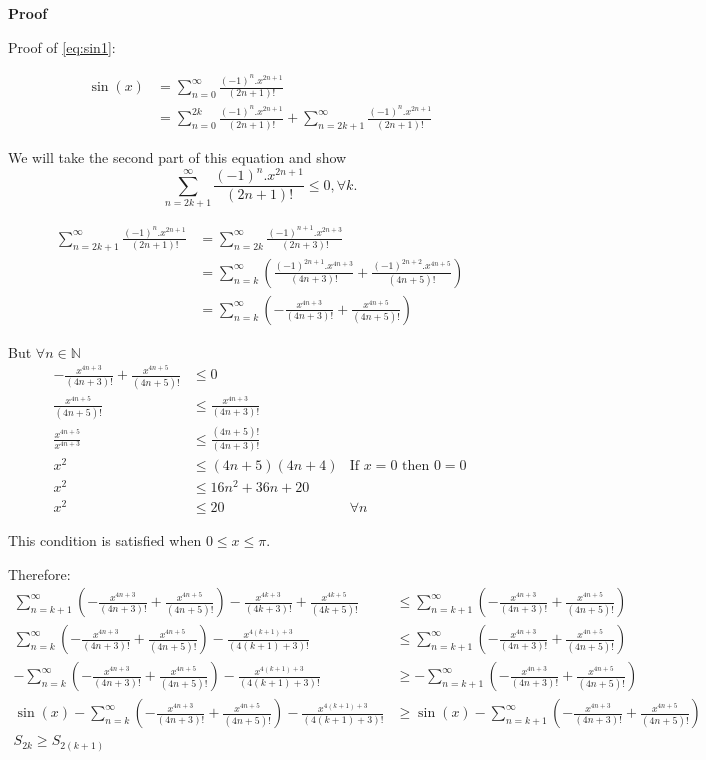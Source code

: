 \documentclass{cs4rep}
\begin{document}
{\bf Proof}

Proof of \ref{eq:sin1}:

\[ \begin{array}{ll}
\sin(x) & = \sum_{n=0}^{\infty} \frac{(-1)^{n}.x^{2n+1}}{(2n+1)!} \\
& = \sum_{n=0}^{2k} \frac{(-1)^{n}.x^{2n+1}}{(2n+1)!} + \sum_{n=2k+1}^{\infty} \frac{(-1)^{n}.x^{2n+1}}{(2n+1)!}
\end{array} \]

We will take the second part of this equation and show 
\[ \sum_{n=2k+1}^{\infty} \frac{(-1)^{n}.x^{2n+1}}{(2n+1)!} \leq 0, \forall k. \]

\[ \begin{array}{ll}
\sum_{n=2k+1}^{\infty} \frac{(-1)^{n}.x^{2n+1}}{(2n+1)!} & = \sum_{n=2k}^{\infty} \frac{(-1)^{n+1}.x^{2n+3}}{(2n+3)!} \\
& = \sum_{n=k}^{\infty} (\frac{(-1)^{2n+1}.x^{4n+3}}{(4n+3)!} + \frac{(-1)^{2n+2}.x^{4n+5}}{(4n+5)!}) \\
& = \sum_{n=k}^{\infty} (- \frac{x^{4n+3}}{(4n+3)!} + \frac{x^{4n+5}}{(4n+5)!}) 
\end{array} \]

But 
$\forall n \in \mathbb{N}$
\[ \begin{array}{rll}
-\frac{x^{4n+3}}{(4n+3)!} + \frac{x^{4n+5}}{(4n+5)!} & \leq 0 \\
\frac{x^{4n+5}}{(4n+5)!} & \leq \frac{x^{4n+3}}{(4n+3)!} \\
\frac{x^{4n+5}}{x^{4n+3}} & \leq \frac{(4n+5)!}{(4n+3)!} \\
x^{2} & \leq (4n+5)(4n+4) & \mbox{If } x = 0 \mbox{ then } 0=0 \\
x^{2} & \leq 16n^2 + 36n + 20  \\
x^{2} & \leq 20  & \forall n
\end{array} \]

This condition is satisfied when $0 \leq x \leq \pi$.

Therefore:
\[ \begin{array}{rll}
\sum_{n=k+1}^{\infty} (- \frac{x^{4n+3}}{(4n+3)!} + \frac{x^{4n+5}}{(4n+5)!}) - \frac{x^{4k+3}}{(4k+3)!} + \frac{x^{4k+5}}{(4k+5)!} & \leq \sum_{n=k+1}^{\infty} (- \frac{x^{4n+3}}{(4n+3)!} + \frac{x^{4n+5}}{(4n+5)!}) \\
\sum_{n=k}^{\infty} (- \frac{x^{4n+3}}{(4n+3)!} + \frac{x^{4n+5}}{(4n+5)!}) - \frac{x^{4(k+1)+3}}{(4(k+1)+3)!} & \leq \sum_{n=k+1}^{\infty} (- \frac{x^{4n+3}}{(4n+3)!} + \frac{x^{4n+5}}{(4n+5)!}) \\
 - \sum_{n=k}^{\infty} (- \frac{x^{4n+3}}{(4n+3)!} + \frac{x^{4n+5}}{(4n+5)!}) - \frac{x^{4(k+1)+3}}{(4(k+1)+3)!} & \geq - \sum_{n=k+1}^{\infty} (- \frac{x^{4n+3}}{(4n+3)!} + \frac{x^{4n+5}}{(4n+5)!}) \\
\sin(x) - \sum_{n=k}^{\infty} (- \frac{x^{4n+3}}{(4n+3)!} + \frac{x^{4n+5}}{(4n+5)!}) - \frac{x^{4(k+1)+3}}{(4(k+1)+3)!} & \geq \sin(x) - \sum_{n=k+1}^{\infty} (- \frac{x^{4n+3}}{(4n+3)!} + \frac{x^{4n+5}}{(4n+5)!}) \\
S_{2k} \geq S_{2(k+1)}
\end{array} \]
\end{document}
